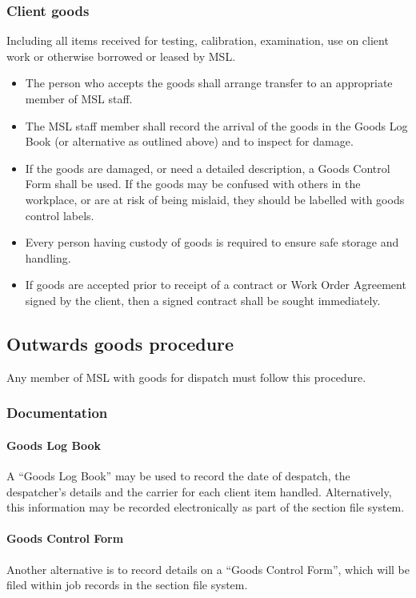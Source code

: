 \subsubsection{Client goods}
Including all items received for testing, calibration, examination, use on client work or otherwise borrowed or leased by MSL. 
\begin{itemize}
\item The person who accepts the goods shall arrange transfer to an appropriate member of MSL staff.
\item The MSL staff member shall record the arrival of the goods in the Goods Log Book (or alternative as outlined above) and to inspect for damage.
\item If the goods are damaged, or need a detailed description, a Goods Control Form shall be used. If the goods may be confused with others in the workplace, or are at risk of being mislaid, they should be labelled with goods control labels. 
\item Every person having custody of goods is required to ensure safe storage and handling. 
\item If goods are accepted prior to receipt of a contract or Work Order Agreement signed by the client, then a signed contract shall be sought immediately.
\end{itemize} 

\subsection{Outwards goods procedure}
Any member of MSL with goods for dispatch must follow this procedure.

\subsubsection{Documentation}
\paragraph{Goods Log Book}
A ``Goods Log Book'' may be used to record the date of despatch, the despatcher's details and the carrier for each client item handled. Alternatively, this information may be recorded electronically as part of the section file system.

\paragraph{Goods Control Form}
Another alternative is to record details on a ``Goods Control Form'', which will be filed within job records in the section file system. 

